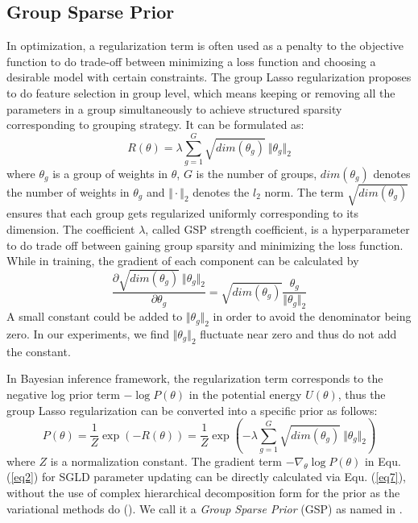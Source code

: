 \documentclass{article} %
\begin{document}
\subsection{Group Sparse Prior}
\label{GSP}
In optimization, a regularization term is often used as a penalty to the objective function to do trade-off between minimizing a loss function and choosing a desirable model with certain constraints. The group Lasso regularization \citet{yuan2006model} proposes to do feature selection in group level, which means keeping or removing all the parameters in a group simultaneously to achieve structured sparsity corresponding to grouping strategy. It can be formulated as:
\begin{equation}
\label{eq5}
R(\theta) = \lambda\sum_{g=1}^{G} \sqrt{dim({\theta}_g)}\ 
\big\Vert \theta_g \big\Vert_{2}
\end{equation}
where $ \theta_g $ is a group of weights in 
$ \theta $, $ G $ is the number of groups,
$dim({\theta}_g)$ denotes the number of weights in $\theta_g$
and $ \Vert \cdot \Vert_2 $ denotes the $ l_2 $ norm. The term $ \sqrt{dim({\theta}_g)} $ ensures that each group gets regularized uniformly corresponding to its dimension. The coefficient $ \lambda $, called GSP strength coefficient, is a hyperparameter to do trade off between gaining group sparsity and minimizing the loss function. While in training, the gradient of each component can be calculated by 
\begin{equation}
\label{eq6}
\frac{\partial\sqrt{dim({\theta}_g)}\ 
\big\Vert \theta_g \big\Vert_{2}}{\partial\theta_g} =
\sqrt{dim({\theta}_g)}\frac{\theta_g}{\Vert \theta_g \Vert_2}
\end{equation}
A small constant could be added to $ \Vert{\theta}_g \Vert_2 $ in order to avoid the denominator being zero. In our experiments, we find
$ \Vert \theta_g \Vert_2 $ fluctuate near zero and thus do not add the constant.

In Bayesian inference framework, the regularization term corresponds to the negative log prior term $ -\log P({\theta}) $ in the potential energy $ U({\theta}) $, thus the group Lasso regularization can be converted into a specific prior as follows:
\begin{equation}
\label{eq7}
P({\theta}) = \frac{1}{Z}\exp(-R({\theta})) =
\frac{1}{Z}\exp(-\lambda\sum_{g=1}^{G} \sqrt{dim({\theta}_g)}\ 
\big\Vert {\theta}_g \big\Vert_{2})
\end{equation}
where $ Z $ is a normalization constant. The gradient term 
$ -\nabla_{{\theta}}\log P({\theta}) $ in Equ. (\ref{eq2}) for SGLD parameter updating can be directly calculated via Equ. (\ref{eq7}), without the use of complex hierarchical decomposition form for the prior as the variational methods do (\citet{marlin2009group,babacan2014bayesian}). We call it a \textit{Group Sparse Prior} (GSP) as named in \citet{marlin2009group}.
\end{document}
